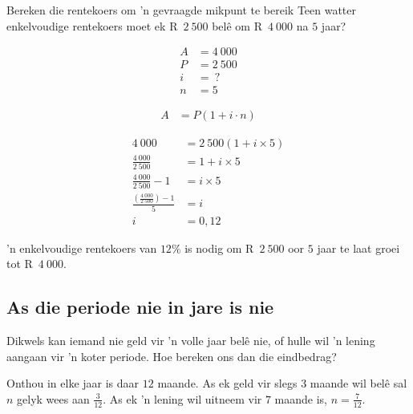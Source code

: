 \begin{wex}{Bereken die rentekoers om 'n gevraagde mikpunt te bereik}{
    Teen watter enkelvoudige rentekoers moet ek R~$2~500$ bel\^e om R~$4~000$ na $5$ jaar?}{

    \begin{align*}
	A &= 4~000\\
	P &= 2~500\\
	i &= ~?\\
	n &= 5
    \end{align*}

    \begin{align*}
	A &= P(1 + i \cdot n)
    \end{align*}

    \begin{align*}
	4~000 &= 2~500(1 + i \times 5)\\
	\frac{4~000}{2~500} &= 1 + i \times 5\\
	\frac{4~000}{2~500} - 1&= i \times 5\\
	\frac{(\frac{4~000}{2~500}) - 1}{5} &= i\\
	i &= 0,12
    \end{align*}

    'n enkelvoudige rentekoers van $12\%$ is nodig om R~$2~500$ oor $5$ jaar te laat groei tot R~$4~000$.
    }
\end{wex}


\subsection{As die periode nie in jare is nie}

Dikwels kan iemand nie geld vir 'n volle jaar bel\^e nie, of hulle wil 'n lening aangaan vir 'n koter periode. Hoe bereken ons dan die eindbedrag?\par

Onthou in elke jaar is daar $12$ maande. As ek geld vir slegs $3$ maande wil bel\^e sal $n$ gelyk wees aan $\frac{3}{12}$. As ek 'n lening wil uitneem vir $7$ maande is, $n = \frac{7}{12}$.\\


